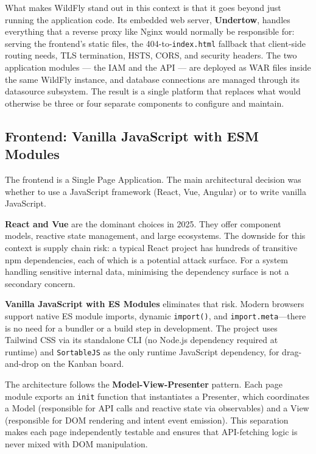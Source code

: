 What makes WildFly stand out in this context is that it goes beyond just running the application code. Its embedded web server, \textbf{Undertow}, handles everything that a reverse proxy like Nginx would normally be responsible for: serving the frontend's static files, the 404-to-\texttt{index.html} fallback that client-side routing needs, TLS termination, HSTS, CORS, and security headers. The two application modules --- the IAM and the API --- are deployed as WAR files inside the same WildFly instance, and database connections are managed through its datasource subsystem. The result is a single platform that replaces what would otherwise be three or four separate components to configure and maintain.

\subsection{Frontend: Vanilla JavaScript with ESM Modules}

The frontend is a Single Page Application. The main architectural decision was whether to use a JavaScript framework (React, Vue, Angular) or to write vanilla JavaScript.

\textbf{React and Vue} are the dominant choices in 2025. They offer component models, reactive state management, and large ecosystems. The downside for this context is supply chain risk: a typical React project has hundreds of transitive npm dependencies, each of which is a potential attack surface. For a system handling sensitive internal data, minimising the dependency surface is not a secondary concern.

\textbf{Vanilla JavaScript with ES Modules} eliminates that risk. Modern browsers support native ES module imports, dynamic \texttt{import()}, and \texttt{import.meta}—there is no need for a bundler or a build step in development. The project uses Tailwind CSS via its standalone CLI (no Node.js dependency required at runtime) and \texttt{SortableJS} as the only runtime JavaScript dependency, for drag-and-drop on the Kanban board.

The architecture follows the \textbf{Model-View-Presenter} pattern. Each page module exports an \texttt{init} function that instantiates a Presenter, which coordinates a Model (responsible for API calls and reactive state via observables) and a View (responsible for DOM rendering and intent event emission). This separation makes each page independently testable and ensures that API-fetching logic is never mixed with DOM manipulation.

